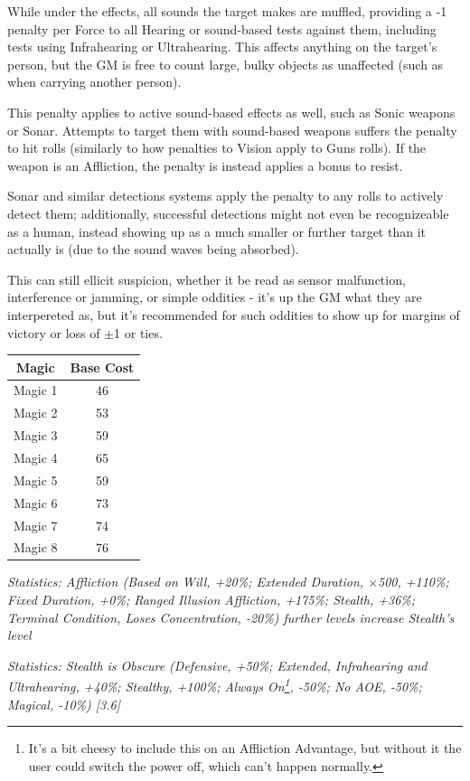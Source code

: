 \begin{multicols*}{3}
	While under the effects, all sounds the target makes are muffled, providing a -1 penalty per Force to all Hearing or sound-based tests against them, including tests using Infrahearing or Ultrahearing. This affects anything on the target's person, but the GM is free to count large, bulky objects as unaffected (such as when carrying another person).
	
	This penalty applies to active sound-based effects as well, such as Sonic weapons or Sonar. Attempts to target them with sound-based weapons suffers the penalty to hit rolls (similarly to how penalties to Vision apply to Guns rolls). If the weapon is an Affliction, the penalty is instead applies a bonus to resist.
	
	Sonar and similar detections systems apply the penalty to any rolls to actively detect them; additionally, successful detections might not even be recognizeable as a human, instead showing up as a much smaller or further target than it actually is (due to the sound waves being absorbed). 
	
	This can still ellicit suspicion, whether it be read as sensor malfunction, interference or jamming, or simple oddities - it's up the GM what they are interpereted as, but it's recommended for such oddities to show up for margins of victory or loss of $\pm$1 or ties.
	
	\begin{center}
		\begin{tabular}{|c|c|}
			\hline
			Magic & Base Cost \\
			\hline
			\hline
			Magic 1 & 46 \\
			Magic 2 & 53 \\
			Magic 3 & 59 \\
			Magic 4 & 65 \\
			Magic 5 & 59 \\
			Magic 6 & 73 \\
			Magic 7 & 74 \\
			Magic 8 & 76 \\
			\hline
		\end{tabular}
	\end{center}
	
	\textcolor{OliveGreen}{\textit{Statistics: Affliction (Based on Will, +20\%; Extended Duration, $\times$500, +110\%; Fixed Duration, +0\%; Ranged Illusion Affliction, +175\%; Stealth, +36\%; Terminal Condition, Loses Concentration, -20\%) further levels increase Stealth's level}}
	
	\textcolor{OliveGreen}{\textit{Statistics: Stealth is Obscure (Defensive, +50\%; Extended, Infrahearing and Ultrahearing, +40\%; Stealthy, +100\%; Always On\footnote{It's a bit cheesy to include this on an Affliction Advantage, but without it the user could switch the power off, which can't happen normally.}, -50\%; No AOE, -50\%; Magical, -10\%) [3.6] }}
	

\end{multicols*}
